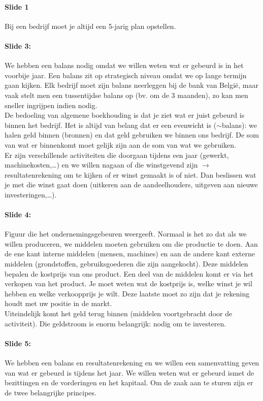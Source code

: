 \documentclass[10pt,a4paper]{report}
\begin{document}
\paragraph{Slide 1} Bij een bedrijf moet je altijd een 5-jarig plan opstellen.

\paragraph{Slide 3:} We hebben een balans nodig omdat we willen weten wat er gebeurd is in het voorbije jaar. Een balans zit op strategisch niveau omdat we op lange termijn gaan kijken. Elk bedrijf moet zijn balans neerleggen bij de bank van Belgi\"e, maar vaak stelt men een tussentijdse balans op (bv. om de 3 maanden), zo kan men sneller ingrijpen indien nodig. \\
De bedoeling van algemene boekhouding is dat je ziet wat er juist gebeurd is binnen het bedrijf. Het is altijd van belang dat er een evenwicht is ($\sim$balans): we halen geld binnen (bronnen) en dat geld gebruiken we binnen ons bedrijf. De som van wat er binnenkomt moet gelijk zijn aan de som van wat we gebruiken.\\
Er zijn verschillende activiteiten die doorgaan tijdens een jaar (gewerkt, machinekosten,…) en we willen nagaan of die winstgevend zijn $\rightarrow$ resultatenrekening om te kijken of er winst gemaakt is of niet. Dan beslissen wat je met die winst gaat doen (uitkeren aan de aandeelhouders, uitgeven aan nieuwe investeringen,…).

\paragraph{Slide 4:} Figuur die het ondernemingsgebeuren weergeeft. Normaal is het zo dat als we willen produceren, we middelen moeten gebruiken om die productie te doen. Aan de ene kant interne middelen (mensen, machines) en aan de andere kant externe middelen (grondstoffen, gebruiksgoederen die zijn aangekocht). Deze middelen bepalen de kostprijs van ons product. Een deel van de middelen komt er via het verkopen van het product. Je moet weten wat de kostprijs is, welke winst je wil hebben en welke verkoopprijs je wilt. Deze laatste moet zo zijn dat je rekening houdt met uw positie in de markt.\\ Uiteindelijk komt het geld terug binnen (middelen voortgebracht door de activiteit).
Die geldstroom is enorm belangrijk: nodig om te investeren.

\paragraph{Slide 5:} We hebben een balans en resultatenrekening en we willen een samenvatting geven van wat er gebeurd is tijdens het jaar. We willen weten wat er gebeurd ismet de bezittingen en de vorderingen en het kapitaal.
Om de zaak aan te sturen zijn er de twee belangrijke principes.
\end{document}
